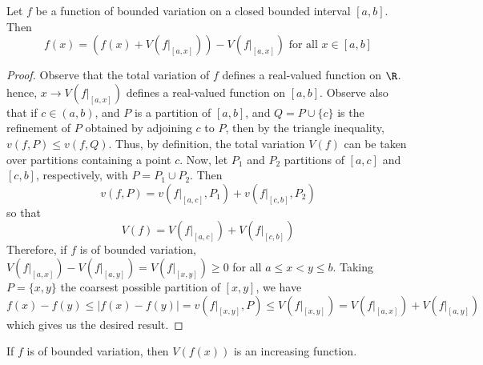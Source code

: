 \begin{lemma}\label{11.2.1}
    Let $f$ be a function of bounded variation on a closed bounded interval
    $[a,b]$. Then
    \begin{equation*}
        f(x)=(f(x)+V(f|_{[a,x]}))-V(f|_{[a,x]}) \text{ for all } x \in [a,b]
    \end{equation*}
\end{lemma}
\begin{proof}
    Observe that the total variation of $f$ defines a real-valued function on
    $\R$. hence,  $x \xrightarrow{} V(f|_{[a,x]})$ defines a real-valued function
    on $[a,b]$. Observe also that if $c \in (a,b)$, and $P$ is a partition of
    $[a,b]$, and $Q=P \cup \{c\}$ is the refinement of $P$ obtained by adjoining
     $c$ to  $P$, then by the triangle inequality,  $v(f,P) \leq v(f,Q)$. Thus,
     by definition, the total variation $V(f)$ can be taken over partitions
     containing a point $c$. Now, let  $P_1$ and $P_2$ partitions of $[a,c]$ and
     $[c,b]$, respectively, with $P=P_1 \cup P_2$. Then
     \begin{equation*}
         v(f,P)=v(f|_{[a,c]},P_1)+v(f|_{[c,b]},P_2)
     \end{equation*}
     so that
     \begin{equation*}
         V(f)=V(f|_{[a,c]})+V(f|_{[c,b]})
     \end{equation*}
     Therefore, if $f$ is of bounded variation,  $V(f|_{[a,x]})-V(f|_{[a,y]})=
     V(f|_{[x,y]}) \geq 0$ for all $a \leq x<y \leq b$. Taking  $P=\{x,y\}$ the
     coarsest possible partition of $[x,y]$, we have
     \begin{equation*}
         f(x)-f(y) \leq |f(x)-f(y)|=v(f|_{[x,y]},P) \leq V(f|_{[x,y]})=
         V(f|_{[a,x]})+V(f|_{[a,y]})
     \end{equation*}
     which gives us the desired result.
\end{proof}
\begin{corollary}
    If $f$ is of bounded variation, then $V(f(x))$ is an increasing function.
\end{corollary}

